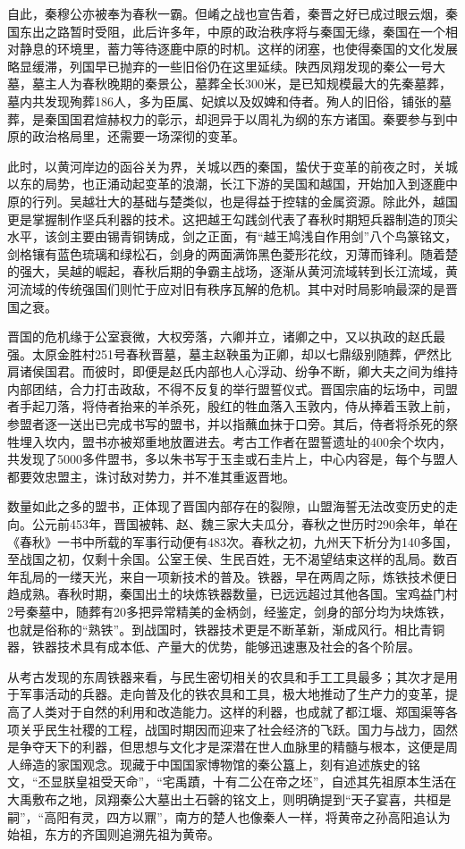 自此，秦穆公亦被奉为春秋一霸。但崤之战也宣告着，秦晋之好已成过眼云烟，秦国东出之路暂时受阻，此后许多年，中原的政治秩序将与秦国无缘，秦国在一个相对静息的环境里，蓄力等待逐鹿中原的时机。这样的闭塞，也使得秦国的文化发展略显缓滞，列国早已抛弃的一些旧俗仍在这里延续。陕西凤翔发现的秦公一号大墓，墓主人为春秋晚期的秦景公，墓葬全长300米，是已知规模最大的先秦墓葬，墓内共发现殉葬186人，多为臣属、妃嫔以及奴婢和侍者。殉人的旧俗，铺张的墓葬，是秦国国君煊赫权力的彰示，却迥异于以周礼为纲的东方诸国。秦要参与到中原的政治格局里，还需要一场深彻的变革。

此时，以黄河岸边的函谷关为界，关城以西的秦国，蛰伏于变革的前夜之时，关城以东的局势，也正涌动起变革的浪潮，长江下游的吴国和越国，开始加入到逐鹿中原的行列。吴越壮大的基础与楚类似，也是得益于控辖的金属资源。除此外，越国更是掌握制作坚兵利器的技术。这把越王勾践剑代表了春秋时期短兵器制造的顶尖水平，该剑主要由锡青铜铸成，剑之正面，有“越王鸠浅自作用剑”八个鸟篆铭文，剑格镶有蓝色琉璃和绿松石，剑身的两面满饰黑色菱形花纹，刃薄而锋利。随着楚的强大，吴越的崛起，春秋后期的争霸主战场，逐渐从黄河流域转到长江流域，黄河流域的传统强国们则忙于应对旧有秩序瓦解的危机。其中对时局影响最深的是晋国之衰。

晋国的危机缘于公室衰微，大权旁落，六卿并立，诸卿之中，又以执政的赵氏最强。太原金胜村251号春秋晋墓，墓主赵鞅虽为正卿，却以七鼎级别随葬，俨然比肩诸侯国君。而彼时，即便是赵氏内部也人心浮动、纷争不断，卿大夫之间为维持内部团结，合力打击政敌，不得不反复的举行盟誓仪式。晋国宗庙的坛场中，司盟者手起刀落，将侍者抬来的羊杀死，殷红的牲血落入玉敦内，侍从捧着玉敦上前，参盟者逐一送出已完成书写的盟书，并以指蘸血抹于口旁。其后，侍者将杀死的祭牲埋入坎内，盟书亦被郑重地放置进去。考古工作者在盟誓遗址的400余个坎内，共发现了5000多件盟书，多以朱书写于玉圭或石圭片上，中心内容是，每个与盟人都要效忠盟主，诛讨敌对势力，并不准其重返晋地。

数量如此之多的盟书，正体现了晋国内部存在的裂隙，山盟海誓无法改变历史的走向。公元前453年，晋国被韩、赵、魏三家大夫瓜分，春秋之世历时290余年，单在《春秋》一书中所载的军事行动便有483次。春秋之初，九州天下析分为140多国，至战国之初，仅剩十余国。公室王侯、生民百姓，无不渴望结束这样的乱局。数百年乱局的一缕天光，来自一项新技术的普及。铁器，早在两周之际，炼铁技术便日趋成熟。春秋时期，秦国出土的块炼铁器数量，已远远超过其他各国。宝鸡益门村2号秦墓中，随葬有20多把异常精美的金柄剑，经鉴定，剑身的部分均为块炼铁，也就是俗称的“熟铁”。到战国时，铁器技术更是不断革新，渐成风行。相比青铜器，铁器技术具有成本低、产量大的优势，能够迅速惠及社会的各个阶层。

从考古发现的东周铁器来看，与民生密切相关的农具和手工工具最多；其次才是用于军事活动的兵器。走向普及化的铁农具和工具，极大地推动了生产力的变革，提高了人类对于自然的利用和改造能力。这样的利器，也成就了都江堰、郑国渠等各项关乎民生社稷的工程，战国时期因而迎来了社会经济的飞跃。国力与战力，固然是争夺天下的利器，但思想与文化才是深潜在世人血脉里的精髓与根本，这便是周人缔造的家国观念。现藏于中国国家博物馆的秦公簋上，刻有追述族史的铭文，“丕显朕皇祖受天命”，“宅禹蹟，十有二公在帝之坯”，自述其先祖原本生活在大禹敷布之地，凤翔秦公大墓出土石磬的铭文上，则明确提到“天子宴喜，共桓是嗣”，“高阳有灵，四方以鼏”，南方的楚人也像秦人一样，将黄帝之孙高阳追认为始祖，东方的齐国则追溯先祖为黄帝。

